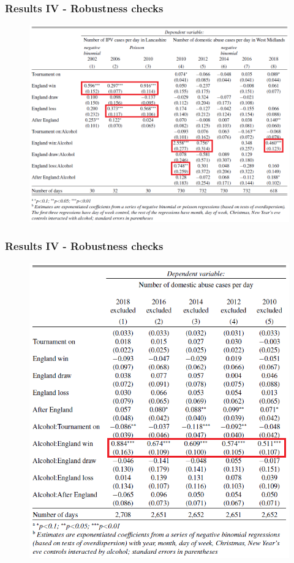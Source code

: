 \documentclass[hyperref={pdfpagelabels=false}]{beamer}
\begin{document}
\begin{frame}
\frametitle{Results IV - Robustness checks}
\begin{center}
\begin{figure}
\includegraphics[scale=0.45]{result4.png}
\end{figure}
\end{center}
\end{frame}

\begin{frame}
\frametitle{Results IV - Robustness checks}
\begin{center}
\begin{figure}
\includegraphics[scale=0.45]{result5.png}
\end{figure}
\end{center}
\end{frame}
\end{document}
